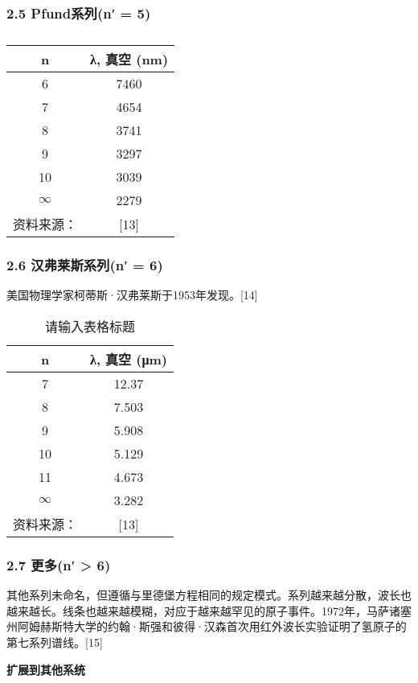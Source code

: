 \subsubsection{2.5 Pfund系列(n′ = 5)}
\begin{table}[ht]
\centering
\caption{ }\label{tab_QYZGP5}
\begin{tabular}{|c|c|}
\hline
n & λ, 真空
(nm)\\
\hline
6 & 7460\\
\hline
7 & 4654\\
\hline
8 & 3741 \\
\hline
9 &3297\\
\hline
10 &3039 \\
\hline
$\infty$ & 2279 \\
\hline
资料来源： & [13] \\
\hline
\end{tabular}
\end{table}
\subsubsection{2.6 汉弗莱斯系列(n′ = 6)}

美国物理学家柯蒂斯·汉弗莱斯于1953年发现。[14]\begin{table}[ht]
\centering
\caption{请输入表格标题}\label{tab_QYZGP6}
\begin{tabular}{|c|c|}
\hline
n & λ, 真空
(μm) \\
\hline
7 & 12.37 \\
\hline
8 & 7.503 \\
\hline
9 & 5.908 \\
\hline
10 & 5.129 \\
\hline
11 & 4.673\\
\hline
$\infty$ & 3.282 \\
\hline
资料来源： & [13] \\
\hline
\end{tabular}
\end{table}

\subsubsection{2.7 更多(n′ > 6)}
其他系列未命名，但遵循与里德堡方程相同的规定模式。系列越来越分散，波长也越来越长。线条也越来越模糊，对应于越来越罕见的原子事件。1972年，马萨诸塞州阿姆赫斯特大学的约翰·斯强和彼得·汉森首次用红外波长实验证明了氢原子的第七系列谱线。[15]


\textbf{扩展到其他系统}

